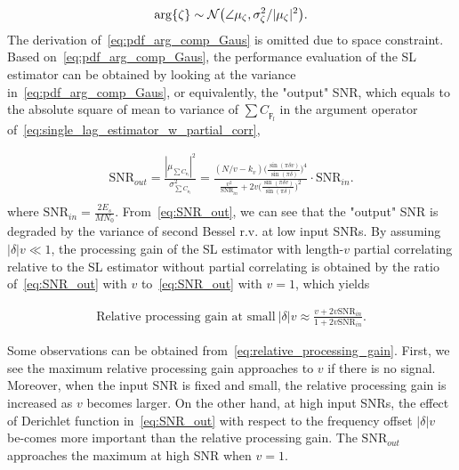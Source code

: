 \begin{equation}
  \label{eq:pdf_arg_comp_Gaus}
  \arg\{\zeta\} \sim \mathcal{N}\big(\angle \mu_{\zeta},\sigma^2_{\zeta}/|\mu_{\zeta}|^2\big).
\end{equation}
The derivation of~\eqref{eq:pdf_arg_comp_Gaus} is omitted due to space constraint.
Based on~\eqref{eq:pdf_arg_comp_Gaus}, the performance evaluation of 
the SL estimator can be obtained by looking at the variance in~\eqref{eq:pdf_arg_comp_Gaus},
or equivalently, the "output" SNR, which equals to the absolute square of mean to variance of
$\sum C_{\digamma_l}$ in the argument operator of~\eqref{eq:single_lag_estimator_w_partial_corr},

\begin{equation}
  \begin{aligned}
    \label{eq:SNR_out}
    \text{SNR}_{out}=\frac{|\mu_{\sum C_{\digamma_l}}|^2}{\sigma^2_{\sum C_{\digamma_l}}} 
    =\frac{(N/v-k_v)\Big(\frac{\sin(\pi \delta v)}{\sin(\pi \delta)}\Big)^4}
    {\frac{v^2}{\text{SNR}_{in}}+2v\Big(\frac{\sin(\pi \delta v)}{\sin(\pi \delta)}\Big)^2}\cdot\text{SNR}_{in}. \\
  \end{aligned}
\end{equation}
where $\text{SNR}_{in}=\frac{2E_s}{MN_0}$. From~\eqref{eq:SNR_out},
we can see that the "output" SNR is degraded by the variance of second
Bessel r.v. at low input SNRs. By assuming $|\delta|v{\ll} 1$, the processing gain
of the SL estimator with length-$v$ partial correlating relative to the SL estimator
without partial correlating is obtained by the ratio of~\eqref{eq:SNR_out} 
with $v$ to~\eqref{eq:SNR_out} with $v=1$, which yields 

\begin{equation}
  \begin{aligned}
    \label{eq:relative_processing_gain}
    \text{Relative processing gain at small}~|\delta|v \approx\frac{v+2v\text{SNR}_{in}}{1+2v\text{SNR}_{in}}.
  \end{aligned}
\end{equation}

Some observations can be obtained from~\eqref{eq:relative_processing_gain}.
First, we see the maximum relative processing gain approaches to $v$ if there is no signal. 
Moreover, when the input SNR is fixed and small, the relative processing gain
is increased as $v$ becomes larger. On the other hand, at high input SNRs,
the effect of Derichlet function in~\eqref{eq:SNR_out} with respect to the frequency offset
$|\delta|v$ be-comes more important than the relative processing gain.
The $\text{SNR}_{out}$ approaches the maximum at high SNR when $v=1$.

